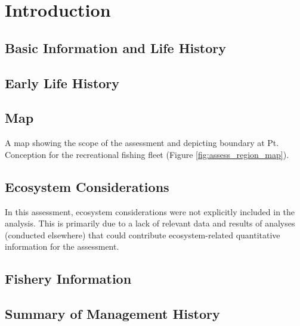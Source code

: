\documentclass[12pt,]{article}
\begin{document}
\newpage

\renewcommand{\thefigure}{\arabic{figure}}
\renewcommand{\thetable}{\arabic{table}}

\setcounter{figure}{0} \setcounter{table}{0}


\section{Introduction}\label{introduction}

\subsection{Basic Information and Life
History}\label{basic-information-and-life-history}

\subsection{Early Life History}\label{early-life-history}

\subsection{Map}\label{map}

A map showing the scope of the assessment and depicting boundary at Pt.
Conception for the recreational fishing fleet (Figure
\ref{fig:assess_region_map}).

\subsection{Ecosystem Considerations}\label{ecosystem-considerations-1}

In this assessment, ecosystem considerations were not explicitly
included in the analysis. This is primarily due to a lack of relevant
data and results of analyses (conducted elsewhere) that could contribute
ecosystem-related quantitative information for the assessment.

\subsection{Fishery Information}\label{fishery-information}

\subsection{Summary of Management
History}\label{summary-of-management-history}
\end{document}
